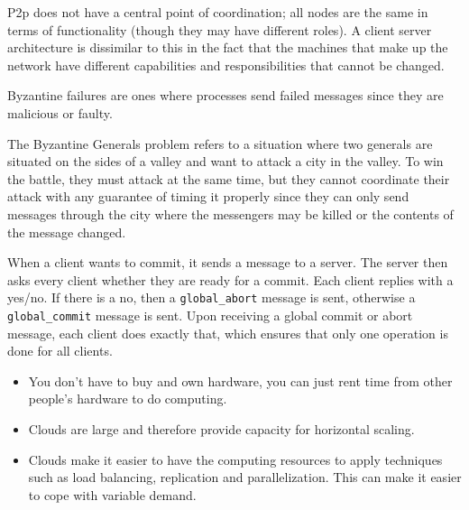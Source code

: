 
P2p does not have a central point of coordination; all nodes are the same in
terms of functionality (though they may have different roles). A client server
architecture is dissimilar to this in the fact that the machines that make up
the network have different capabilities and responsibilities that cannot be
changed.


Byzantine failures are ones where processes send failed messages since they are
malicious or faulty.

The Byzantine Generals problem refers to a situation where two generals  are
situated on the sides of a valley and want to attack a city in the valley. To
win the battle, they must attack at the same time, but they cannot coordinate
their attack with any guarantee of timing it properly since they can only send
messages through the city where the messengers may be killed or the contents of
the message changed.


When a client wants to commit, it sends a message to a server. The server then
asks every client whether they are ready for a commit. Each client replies with
a yes/no. If there is a no, then a \texttt{global\_abort} message is sent,
otherwise a \texttt{global\_commit} message is sent. Upon receiving a global
commit or abort message, each client does exactly that, which ensures that only
one operation is done for all clients.


\begin{itemize}
\item You don’t have to buy and own hardware, you can just rent time from other
  people’s hardware to do computing.
\item Clouds are large and therefore provide capacity for horizontal scaling.
\item Clouds make it easier to have the computing resources to apply techniques
  such as load balancing, replication and parallelization. This can make it
  easier to cope with variable demand.
\end{itemize}

